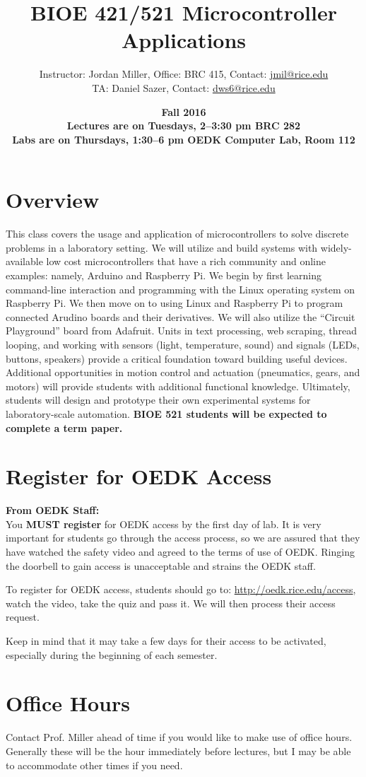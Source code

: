 \documentclass[10pt]{article}
\title{\textbf{BIOE 421/521 Microcontroller Applications}}
\date{\textbf{Fall 2016\\Lectures are on Tuesdays, 2--3:30 pm BRC 282\\Labs are on Thursdays, 1:30--6 pm OEDK Computer Lab, Room 112}}                                           %
\author{Instructor: Jordan Miller, Office: BRC 415, Contact: \href{mailto:jmil@rice.edu}{jmil@rice.edu} \\ TA: Daniel Sazer, Contact: \href{mailto:dws6@rice.edu}{dws6@rice.edu}}
\begin{document}
\maketitle

\section*{Overview}
This class covers the usage and application of microcontrollers to solve discrete problems in a laboratory setting. We will utilize and build systems with widely-available low cost microcontrollers that have a rich community and online examples: namely, Arduino and Raspberry Pi. We begin by first learning command-line interaction and programming with the Linux operating system on Raspberry Pi. We then move on to using Linux and Raspberry Pi to program connected Arudino boards and their derivatives. We will also utilize the ``Circuit Playground'' board from Adafruit. Units in text processing, web scraping, thread looping, and working with sensors (light, temperature, sound) and signals (LEDs, buttons, speakers) provide a critical foundation toward building useful devices. Additional opportunities in motion control and actuation (pneumatics, gears, and motors) will provide students with additional functional knowledge. Ultimately, students will design and prototype their own experimental systems for laboratory-scale automation. \textbf{BIOE 521 students will be expected to complete a term paper.}

\section*{Register for OEDK Access}
\textbf{From OEDK Staff:}\\
You \textbf{MUST register} for OEDK access by the first day of lab. It is very important for students go through the access process, so we are assured that they have watched the safety video and agreed to the terms of use of OEDK. Ringing the doorbell to gain access is unacceptable and strains the OEDK staff.  

To register for OEDK access, students should go to: \href{http://oedk.rice.edu/access}{http://oedk.rice.edu/access}, watch the video, take the quiz and pass it. We will then process their access request.

Keep in mind that it may take a few days for their access to be activated, especially during the beginning of each semester.

\section*{Office Hours}
Contact Prof. Miller ahead of time if you would like to make use of office hours. Generally these will be the hour immediately before lectures, but I may be able to accommodate other times if you need.
\end{document}
